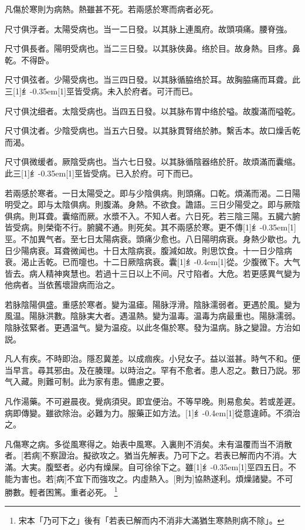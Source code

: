 \documentclass[oneside,b4paper]{ctexbook}
\begin{document}
\begin{flushleft}
凡傷於寒則为病熱。熱雖甚不死。若兩感於寒而病者必死。

尺寸俱浮者。太陽受病也。当一二日發。以其脉上連風府。故頭項痛。腰脊強。

尺寸俱長者。陽明受病也。当二三日發。以其脉俠鼻。络於目。故身熱。目疼。鼻乾。不得卧。

尺寸俱弦者。少陽受病也。当三四日發。以其脉循脇络於耳。故胸脇痛而耳聋。此三{\hbox{\scalebox{0.68}[1]{纟}\kern-0.35em\scalebox{0.64}[1]{巠}}}皆受病。未入於府者。可汗而已。

尺寸俱沈细者。太陰受病也。当四五日發。以其脉布胃中络於嗌。故腹滿而嗌乾。

尺寸俱沈者。少陰受病也。当五六日發。以其脉貫腎络於肺。繫舌本。故口燥舌乾而渴。

尺寸俱微缓者。厥陰受病也。当六七日發。以其脉循陰器络於肝。故煩滿而囊缩。此三{\hbox{\scalebox{0.68}[1]{纟}\kern-0.35em\scalebox{0.64}[1]{巠}}}皆受病。已入於府。可下而已。

若兩感於寒者。一日太陽受之。即与少陰俱病。則頭痛。口乾。煩滿而渴。二日陽明受之。即与太陰俱病。則腹滿。身熱。不欲食。譫語。三日少陽受之。即与厥陰俱病。則耳聋。囊缩而厥。水漿不入。不知人者。六日死。若三陰三陽。五臓六腑皆受病。則榮衛不行。腑臓不通。則死矣。其不兩感於寒。更不傳{\hbox{\scalebox{0.68}[1]{纟}\kern-0.35em\scalebox{0.64}[1]{巠}}}。不加異气者。至七日太陽病衰。頭痛少愈也。八日陽明病衰。身熱少歇也。九日少陽病衰。耳聋微闻也。十日太陰病衰。腹減如故。則思饮食。十一日少陰病衰。渴止舌乾。已而嚏也。十二日厥陰病衰。囊{\hbox{\scalebox{0.6}[1]{纟}\kern-0.4em\scalebox{0.7}[1]{從}}}。少腹微下。大气皆去。病人精神爽慧也。若過十三日以上不间。尺寸陷者。大危。若更感異气變为他病者。当依舊壞證病而治之。

若脉陰陽俱盛。重感於寒者。變为温瘧。陽脉浮滑。陰脉濡弱者。更遇於風。變为風温。陽脉洪數。陰脉実大者。遇温熱。變为温毒。温毒为病最重也。陽脉濡弱。陰脉弦緊者。更遇温气。變为温疫。以此冬傷於寒。發为温病。脉之變證。方治如説。

凡人有疾。不時即治。隱忍冀差。以成痼疾。小兒女子。益以滋甚。時气不和。便当早言。尋其邪由。及在腠理。以時治之。罕有不愈者。患人忍之。數日乃説。邪气入藏。則難可制。此为家有患。備慮之要。

凡作湯藥。不可避晨夜。覺病須臾。即宜便治。不等早晚。則易愈矣。若或差遲。病即傳變。雖欲除治。必難为力。服藥正如方法。{\hbox{\scalebox{0.6}[1]{纟}\kern-0.4em\scalebox{0.7}[1]{從}}}意違師。不須治之。

凡傷寒之病。多從風寒得之。始表中風寒。入裏則不消矣。未有温覆而当不消散者。[若病]不察證治。擬欲攻之。猶当先解表。乃可下之。若表已解而内不消。大滿。大実。腹堅者。必内有燥屎。自可徐徐下之。雖{\hbox{\scalebox{0.68}[1]{纟}\kern-0.35em\scalebox{0.64}[1]{巠}}}四五日。不能为害也。若[病]不宜下而強攻之。内虛熱入。[則为]協熱遂利。煩燥諸變。不可勝數。輕者困篤。重者必死。
\footnote{宋本「乃可下之」後有「若表已解而内不消非大滿猶生寒熱則病不除」。}


\end{flushleft}
\end{document}
